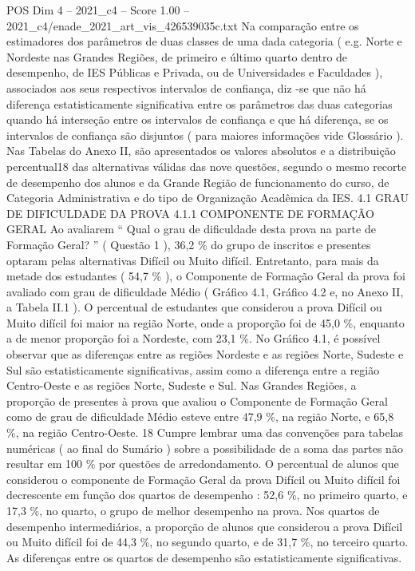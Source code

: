 \begin{textsample}{POS Dim 4 – 2021\_c4 – Score 1.00 – 2021\_c4/enade\_2021\_art\_vis\_426539035c.txt}
Na comparação entre os estimadores dos parâmetros de duas classes de uma dada categoria ( e.g.
Norte e Nordeste nas Grandes Regiões, de primeiro e último quarto dentro de desempenho, de IES Públicas e Privada, ou de Universidades e Faculdades ), associados aos seus respectivos intervalos de confiança, diz -se que não há diferença estatisticamente significativa entre os parâmetros das duas categorias quando há interseção entre os intervalos de confiança e que há diferença, se os intervalos de confiança são disjuntos ( para maiores informações vide Glossário ).
Nas Tabelas do Anexo II, são apresentados os valores absolutos e a distribuição percentual18 das alternativas válidas das nove questões, segundo o mesmo recorte de desempenho dos alunos e da Grande Região de funcionamento do curso, de Categoria Administrativa e do tipo de Organização Acadêmica da IES. 4.1 GRAU DE DIFICULDADE DA PROVA 4.1.1 COMPONENTE DE FORMAÇÃO GERAL Ao avaliarem “ Qual o grau de dificuldade desta prova na parte de Formação Geral? ” ( Questão 1 ), 36,2 \% do grupo de inscritos e presentes optaram pelas alternativas Difícil ou Muito difícil.
Entretanto, para mais da metade dos estudantes ( 54,7 \% ), o Componente de Formação Geral da prova foi avaliado com grau de dificuldade Médio ( Gráfico 4.1, Gráfico 4.2 e, no Anexo II, a Tabela II.1 ).
O percentual de estudantes que considerou a prova Difícil ou Muito difícil foi maior na região Norte, onde a proporção foi de 45,0 \%, enquanto a de menor proporção foi a Nordeste, com 23,1 \%.
No Gráfico 4.1, é possível observar que as diferenças entre as regiões Nordeste e as regiões Norte, Sudeste e Sul são estatisticamente significativas, assim como a diferença entre a região Centro-Oeste e as regiões Norte, Sudeste e Sul.
Nas Grandes Regiões, a proporção de presentes à prova que avaliou o Componente de Formação Geral como de grau de dificuldade Médio esteve entre 47,9 \%, na região Norte, e 65,8 \%, na região Centro-Oeste. 18 Cumpre lembrar uma das convenções para tabelas numéricas ( ao final do Sumário ) sobre a possibilidade de a soma das partes não resultar em 100 \% por questões de arredondamento.
O percentual de alunos que considerou o componente de Formação Geral da prova Difícil ou Muito difícil foi decrescente em função dos quartos de desempenho : 52,6 \%, no primeiro quarto, e 17,3 \%, no quarto, o grupo de melhor desempenho na prova.
Nos quartos de desempenho intermediários, a proporção de alunos que considerou a prova Difícil ou Muito difícil foi de 44,3 \%, no segundo quarto, e de 31,7 \%, no terceiro quarto.
As diferenças entre os quartos de desempenho são estatisticamente significativas.

\end{textsample}
